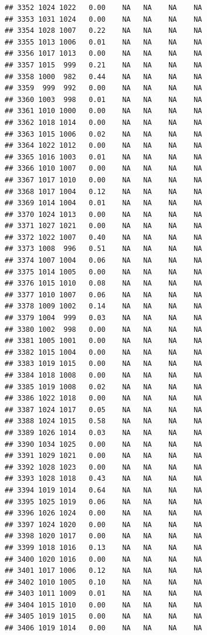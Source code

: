 \documentclass{article}\usepackage{graphicx, color}
\makeatletter
\newenvironment{kframe}{%
 \def\at@end@of@kframe{}%
 \ifinner\ifhmode%
  \def\at@end@of@kframe{\end{minipage}}%
  \begin{minipage}{\columnwidth}%
 \fi\fi%
 \def\FrameCommand##1{\hskip\@totalleftmargin \hskip-\fboxsep
 \colorbox{shadecolor}{##1}\hskip-\fboxsep
     \hskip-\linewidth \hskip-\@totalleftmargin \hskip\columnwidth}%
 \MakeFramed {\advance\hsize-\width
   \@totalleftmargin\z@ \linewidth\hsize
   \@setminipage}}%
 {\par\unskip\endMakeFramed%
 \at@end@of@kframe}
\newenvironment{knitrout}{}{} %
\makeatother
\begin{document}
\begin{knitrout}
\begin{kframe}
\begin{verbatim}
## 3352 1024 1022   0.00    NA   NA    NA    NA
## 3353 1031 1024   0.00    NA   NA    NA    NA
## 3354 1028 1007   0.22    NA   NA    NA    NA
## 3355 1013 1006   0.01    NA   NA    NA    NA
## 3356 1017 1013   0.00    NA   NA    NA    NA
## 3357 1015  999   0.21    NA   NA    NA    NA
## 3358 1000  982   0.44    NA   NA    NA    NA
## 3359  999  992   0.00    NA   NA    NA    NA
## 3360 1003  998   0.01    NA   NA    NA    NA
## 3361 1010 1000   0.00    NA   NA    NA    NA
## 3362 1018 1014   0.00    NA   NA    NA    NA
## 3363 1015 1006   0.02    NA   NA    NA    NA
## 3364 1022 1012   0.00    NA   NA    NA    NA
## 3365 1016 1003   0.01    NA   NA    NA    NA
## 3366 1010 1007   0.00    NA   NA    NA    NA
## 3367 1017 1010   0.00    NA   NA    NA    NA
## 3368 1017 1004   0.12    NA   NA    NA    NA
## 3369 1014 1004   0.01    NA   NA    NA    NA
## 3370 1024 1013   0.00    NA   NA    NA    NA
## 3371 1027 1021   0.00    NA   NA    NA    NA
## 3372 1022 1007   0.40    NA   NA    NA    NA
## 3373 1008  996   0.51    NA   NA    NA    NA
## 3374 1007 1004   0.06    NA   NA    NA    NA
## 3375 1014 1005   0.00    NA   NA    NA    NA
## 3376 1015 1010   0.08    NA   NA    NA    NA
## 3377 1010 1007   0.06    NA   NA    NA    NA
## 3378 1009 1002   0.14    NA   NA    NA    NA
## 3379 1004  999   0.03    NA   NA    NA    NA
## 3380 1002  998   0.00    NA   NA    NA    NA
## 3381 1005 1001   0.00    NA   NA    NA    NA
## 3382 1015 1004   0.00    NA   NA    NA    NA
## 3383 1019 1015   0.00    NA   NA    NA    NA
## 3384 1018 1008   0.00    NA   NA    NA    NA
## 3385 1019 1008   0.02    NA   NA    NA    NA
## 3386 1022 1018   0.00    NA   NA    NA    NA
## 3387 1024 1017   0.05    NA   NA    NA    NA
## 3388 1024 1015   0.58    NA   NA    NA    NA
## 3389 1026 1014   0.03    NA   NA    NA    NA
## 3390 1034 1025   0.00    NA   NA    NA    NA
## 3391 1029 1021   0.00    NA   NA    NA    NA
## 3392 1028 1023   0.00    NA   NA    NA    NA
## 3393 1028 1018   0.43    NA   NA    NA    NA
## 3394 1019 1014   0.64    NA   NA    NA    NA
## 3395 1025 1019   0.06    NA   NA    NA    NA
## 3396 1026 1024   0.00    NA   NA    NA    NA
## 3397 1024 1020   0.00    NA   NA    NA    NA
## 3398 1020 1017   0.00    NA   NA    NA    NA
## 3399 1018 1016   0.13    NA   NA    NA    NA
## 3400 1020 1016   0.00    NA   NA    NA    NA
## 3401 1017 1006   0.12    NA   NA    NA    NA
## 3402 1010 1005   0.10    NA   NA    NA    NA
## 3403 1011 1009   0.01    NA   NA    NA    NA
## 3404 1015 1010   0.00    NA   NA    NA    NA
## 3405 1019 1015   0.00    NA   NA    NA    NA
## 3406 1019 1014   0.00    NA   NA    NA    NA

\end{verbatim}
\end{kframe}
\end{knitrout}
\end{document}
